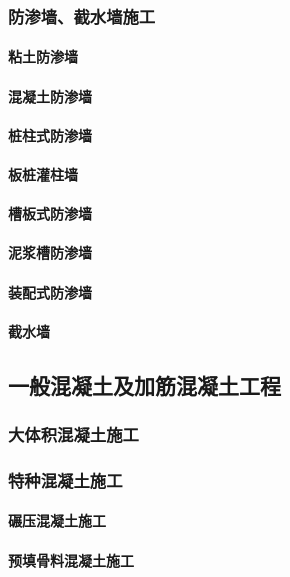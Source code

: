 \documentclass[UTF8]{../../ApplicationUniverse}
\begin{document}
        \subsubsection{防渗墙、截水墙施工}
            \paragraph{粘土防渗墙}
            \paragraph{混凝土防渗墙}
            \paragraph{桩柱式防渗墙}
            \paragraph{板桩灌柱墙}
            \paragraph{槽板式防渗墙}
            \paragraph{泥浆槽防渗墙}
            \paragraph{装配式防渗墙}
            \paragraph{截水墙}
    \subsection{一般混凝土及加筋混凝土工程}
        \subsubsection{大体积混凝土施工}
        \subsubsection{特种混凝土施工}
            \paragraph{碾压混凝土施工}
            \paragraph{预填骨料混凝土施工}
\end{document}
